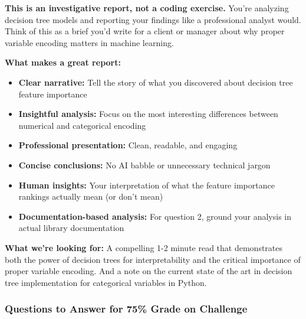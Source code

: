 \documentclass[
  letterpaper,
  DIV=11,
  numbers=noendperiod]{scrartcl}
\providecommand{\tightlist}{%
  \setlength{\itemsep}{0pt}\setlength{\parskip}{0pt}}
\begin{document}
\begin{tcolorbox}[enhanced jigsaw, colbacktitle=quarto-callout-important-color!10!white, arc=.35mm, rightrule=.15mm, breakable, bottomrule=.15mm, opacitybacktitle=0.6, colframe=quarto-callout-important-color-frame, colback=white, opacityback=0, left=2mm, leftrule=.75mm, toprule=.15mm, bottomtitle=1mm, toptitle=1mm, titlerule=0mm, coltitle=black, title=\textcolor{quarto-callout-important-color}{\faExclamation}\hspace{0.5em}{📊 What You're Really Being Graded On}]

\textbf{This is an investigative report, not a coding exercise.} You're
analyzing decision tree models and reporting your findings like a
professional analyst would. Think of this as a brief you'd write for a
client or manager about why proper variable encoding matters in machine
learning.

\textbf{What makes a great report:}

\begin{itemize}
\tightlist
\item
  \textbf{Clear narrative:} Tell the story of what you discovered about
  decision tree feature importance
\item
  \textbf{Insightful analysis:} Focus on the most interesting
  differences between numerical and categorical encoding
\item
  \textbf{Professional presentation:} Clean, readable, and engaging
\item
  \textbf{Concise conclusions:} No AI babble or unnecessary technical
  jargon
\item
  \textbf{Human insights:} Your interpretation of what the feature
  importance rankings actually mean (or don't mean)
\item
  \textbf{Documentation-based analysis:} For question 2, ground your
  analysis in actual library documentation
\end{itemize}

\textbf{What we're looking for:} A compelling 1-2 minute read that
demonstrates both the power of decision trees for interpretability and
the critical importance of proper variable encoding. And a note on the
current state of the art in decision tree implementation for categorical
variables in Python.

\end{tcolorbox}

\subsubsection{Questions to Answer for 75\% Grade on
Challenge}\label{questions-to-answer-for-75-grade-on-challenge}
\end{document}

